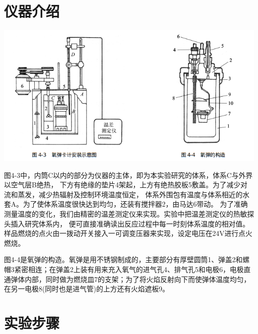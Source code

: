 \documentclass[11pt]{report}
\begin{document}
\chapter{仪器介绍}
\label{sec:org0cf643a}
\begin{center}
\includegraphics[width=.9\linewidth]{../img/2.png}
\end{center}
图4-3中，内筒C以内的部分为仪器的主体，即为本实验研究的体系，体系C与外界以空气层B绝热，
下方有绝缘的垫片4架起，上方有绝热胶板5敷盖。为了减少对流和蒸发，减少热辐射及控制环境温度恒定，
体系外围包有温度与体系相近的水套A。为了使体系温度很快达到均匀，还装有搅拌器2，由马达6带动。
为了准确测量温度的变化，我们由精密的温差测定仪来实现。实验中把温差测定仪的热敏探头插入研究体系内，
便可直接准确读出反应过程中每一时刻体系温度的相对值。
样品燃烧的点火由一拨动开关接入一可调变压器来实现，设定电压在24V进行点火燃烧。

图4-4是氧弹的构造。氧弹是用不锈钢制成的，主要部分有厚壁圆筒1、弹盖2和螺帽3紧密相连；在弹盖2上装有用来充入氧气的进气孔4、排气孔5和电极6，电极直通弹体内部，同时做为燃烧皿7的支架；为了将火焰反射向下而使弹体温度均匀，在另一电极8(同时也是进气管)的上方还有火焰遮板9。

\chapter{实验步骤}
\label{sec:org0fd2294}
\end{document}
